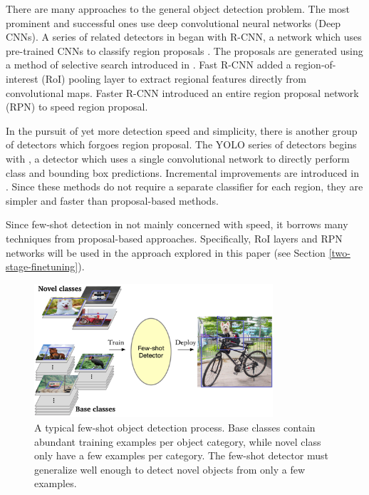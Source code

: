 \documentclass{article}
\begin{document}
There are many approaches to the general object detection problem. The most prominent and successful ones use
deep convolutional neural networks (Deep CNNs). A series of related detectors in
\cite{girshick2014rich,girshick2015fast,ren2015faster} began with R-CNN, a network which uses pre-trained CNNs 
to classify region proposals \cite{girshick2014rich}. The proposals are generated using  a method of 
selective search introduced in \cite{uijlings2013selective}. Fast R-CNN \cite{girshick2015fast} added a
region-of-interest (RoI) pooling layer to extract regional features directly from convolutional maps. 
Faster R-CNN \cite{ren2015faster} introduced an entire region proposal network (RPN) to speed region proposal.

In the pursuit of yet more detection speed and simplicity, there is another group of detectors which 
forgoes region proposal. The YOLO series of detectors begins with \cite{redmon2016yolo}, 
a detector which uses a single convolutional network to directly perform class and bounding box predictions. 
Incremental improvements  are introduced in \cite{redmon2017yolo9000,redmon2018yolov3}. 
Since these methods do not require a separate classifier for each region, they are simpler and faster than 
proposal-based methods.


Since few-shot detection in not mainly concerned with speed, it borrows many techniques from 
proposal-based approaches. Specifically, RoI layers and RPN networks will be used in the approach 
explored in this paper (see Section \ref{two-stage-finetuning}).

\begin{figure}[]
  \centering
  \begin{minipage}{1\textwidth}
  \centering
  \includegraphics[width=0.79\textwidth, height=0.27\textheight]{./../../figures/fs_det/fs-det.png}
  \end{minipage}
\caption{A typical few-shot object detection process. Base classes contain abundant 
training examples per object category, while novel class only have a few examples 
per category. The few-shot detector must generalize well enough to detect novel objects 
from only a few examples.}
\label{fs-det}
\end{figure}
\end{document}
